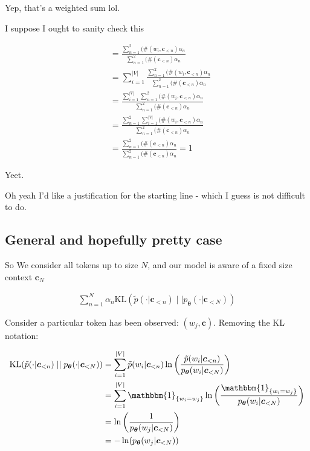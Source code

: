 \documentclass{article}
\newcommand{\KL}{\mathrm{KL}}
\newcommand{\vtheta}{\boldsymbol{\theta}}
\newcommand{\model}{p_{\vtheta}}
\newcommand{\context}{\boldsymbol{c}}
\begin{document}
			Yep, that's a weighted sum lol. 
			
			I suppose I ought to sanity check this
		
			\begin{align}
				&= \frac{\sum^2_{n=1} (\#(w_i, \context_{<n})\alpha_n}{\sum^2_{n=1} (\#(\context_{<n})\alpha_n}\\
				&= \sum^{|V|}_{i=1}\frac{\sum^2_{n=1} (\#(w_i, \context_{<n})\alpha_n}{\sum^2_{n=1} (\#(\context_{<n})\alpha_n}\\
				&= \frac{ \sum^{|V|}_{i=1} \sum^2_{n=1} (\#(w_i, \context_{<n})\alpha_n}{\sum^2_{n=1} (\#(\context_{<n})\alpha_n}\\
				&= \frac{  \sum^2_{n=1} \sum^{|V|}_{i=1} (\#(w_i, \context_{<n})\alpha_n}{\sum^2_{n=1} (\#(\context_{<n})\alpha_n}\\
				&= \frac{  \sum^2_{n=1} (\#(\context_{<n})\alpha_n}{\sum^2_{n=1} (\#(\context_{<n})\alpha_n} = 1
			\end{align}
		
			Yeet.
			
			Oh yeah I'd like a justification for the starting line - which I guess is not difficult to do. 
			
		\subsection{General and hopefully pretty case}
		
			So We consider all tokens up to size $N$, and our model is aware of a fixed size context $\context_N$
			
			\begin{align}
				\sum^N_{n=1} \alpha_n \KL (\tilde{p}(\cdot | \context_{<n}) \mid\mid \model(\cdot | \context_{<N}))
			\end{align}
			
			Consider a particular token has been observed: $(w_j, \context)$. Removing the KL notation:
			
			\begin{align}
				\KL (\tilde{p}(\cdot | \context_{<n}) \mid\mid \model(\cdot | \context_{<N})) &= \sum^{|V|}_{i=1} \tilde{p}(w_i | \context_{<n})\ln\bigg(\frac{\tilde{p}(w_i | \context_{<n})}{\model(w_i| \context_{<N})}\bigg)\\
				&= \sum^{|V|}_{i=1} \mathbbm{1}_{\{w_i = w_j\}} \ln\bigg(\frac{\mathbbm{1}_{\{w_i = w_j\}}}{\model(w_i| \context_{<N})}\bigg)\\
				&= \ln\bigg(\frac{1}{\model(w_j| \context_{<N})}\bigg)\\
				&= -\ln(\model(w_j| \context_{<N}))		
			\end{align}
			
\end{document}
